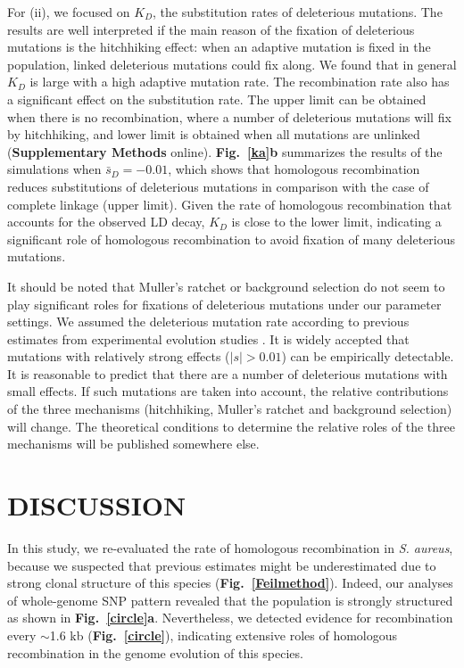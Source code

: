 \documentclass[twoside,twocolumn, letterpaper]{article}
\begin{document}
For (ii), we focused on $K_D$, the substitution rates of deleterious mutations. The results are well interpreted if the main reason of the fixation of deleterious mutations is the hitchhiking effect: when an adaptive mutation is fixed in the population, linked deleterious mutations could fix along. We found that in general $K_D$ is large with a high adaptive mutation rate. 
The recombination rate also has a significant effect on the substitution rate. The upper limit can be obtained when there is no recombination, where a number of deleterious mutations will fix by hitchhiking, and lower limit is obtained when all mutations are unlinked ({\bf Supplementary Methods} online). {\bf Fig.~\ref{ka}b} summarizes the results of the simulations when $\bar{s}_{D}=-0.01$, which shows that homologous recombination reduces substitutions of deleterious mutations in comparison with the case of complete linkage (upper limit). Given the rate of homologous recombination that accounts for the observed LD decay, $K_D$ is close to the lower limit, indicating a significant role of homologous recombination to avoid fixation of many deleterious mutations.
 
It should be noted that Muller's ratchet or background selection do not seem to play significant roles for fixations of deleterious mutations under our parameter settings. We assumed the deleterious mutation rate according to previous estimates from experimental evolution studies \cite[]{Kibota_1996_8649513}. It is widely accepted that mutations with relatively strong effects ($|s|>0.01$) \cite[]{Kimura83} can be empirically detectable. It is reasonable to predict that there are a number of deleterious mutations with small effects. If such mutations are taken into account, the relative contributions of the three mechanisms (hitchhiking, Muller's ratchet and background selection) will change. The theoretical conditions to determine the relative roles of the three mechanisms will be published somewhere else. 

\section*{DISCUSSION}

In this study, we re-evaluated the rate of homologous recombination in \emph{S. aureus}, because we suspected that previous estimates might be underestimated due to strong clonal structure of this species ({\bf Fig.~\ref{Feilmethod}}). Indeed, our analyses of whole-genome SNP pattern revealed that the population is strongly structured as shown in {\bf Fig.~\ref{circle}a}. Nevertheless, we detected evidence for recombination every $\sim$1.6 kb ({\bf Fig.~\ref{circle}}), indicating extensive roles of homologous recombination in the genome evolution of this species. 
\end{document}
